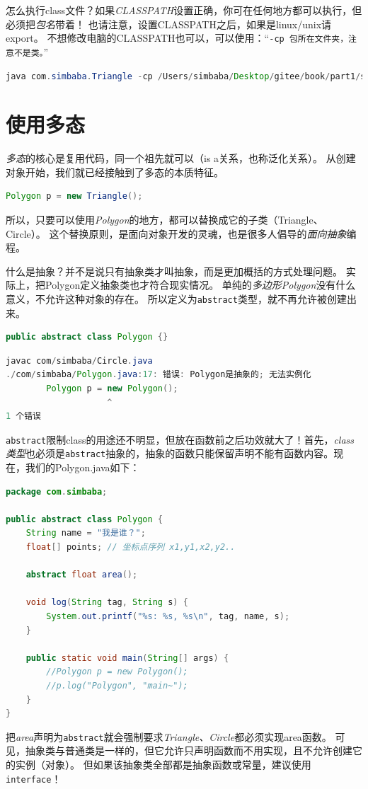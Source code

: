 怎么执行class文件？如果\emph{CLASSPATH}设置正确，你可在任何地方都可以执行，但必须把\emph{包名}带着！
也请注意，设置CLASSPATH之后，如果是linux/unix请export。
不想修改电脑的CLASSPATH也可以，可以使用：“\lstinline{-cp 包所在文件夹，注意不是类。}”
\vspace{0.3cm}
\begin{lstlisting}[language=Java,mathescape]
java com.simbaba.Triangle -cp /Users/simbaba/Desktop/gitee/book/part1/src
\end{lstlisting}


\section{使用多态}
\emph{多态}的核心是复用代码，同一个祖先就可以（is a关系，也称泛化关系）。
从创建对象开始，我们就已经接触到了多态的本质特征。
\vspace{0.3cm}
\begin{lstlisting}[language=Java,mathescape]
Polygon p = new Triangle();
\end{lstlisting}
\noindent
所以，只要可以使用\emph{Polygon}的地方，都可以替换成它的子类（Triangle、Circle）。
这个替换原则，是面向对象开发的灵魂，也是很多人倡导的\emph{面向抽象}编程。

什么是抽象？并不是说只有抽象类才叫抽象，而是更加概括的方式处理问题。
实际上，把Polygon定义抽象类也才符合现实情况。
单纯的\emph{多边形Polygon}没有什么意义，不允许这种对象的存在。
所以定义为\lstinline{abstract}类型，就不再允许被创建出来。
\vspace{0.3cm}

\begin{lstlisting}[language=Java]
public abstract class Polygon {}
\end{lstlisting}
\begin{lstlisting}[language=Java]
javac com/simbaba/Circle.java
./com/simbaba/Polygon.java:17: 错误: Polygon是抽象的; 无法实例化
        Polygon p = new Polygon();
                    ^
1 个错误
\end{lstlisting}

\noindent
\lstinline{abstract}限制class的用途还不明显，但放在函数前之后功效就大了！首先，\emph{class类型}也必须是\lstinline{abstract}抽象的，抽象的函数只能保留声明不能有函数内容。现在，我们的Polygon.java如下：

\begin{lstlisting}[language=Java,mathescape]
package com.simbaba;

public abstract class Polygon {
    String name = "我是谁？";
    float[] points; // 坐标点序列 x1,y1,x2,y2..

    abstract float area();

    void log(String tag, String s) {
        System.out.printf("%s: %s, %s\n", tag, name, s);
    }

    public static void main(String[] args) {
        //Polygon p = new Polygon();
        //p.log("Polygon", "main~");
    }
}
\end{lstlisting}
\noindent
把\emph{area}声明为\lstinline{abstract}就会强制要求\emph{Triangle、Circle}都必须实现area函数。
可见，抽象类与普通类是一样的，但它允许只声明函数而不用实现，且不允许创建它的实例（对象）。
但如果该抽象类全部都是抽象函数或常量，建议使用\lstinline{interface}！

